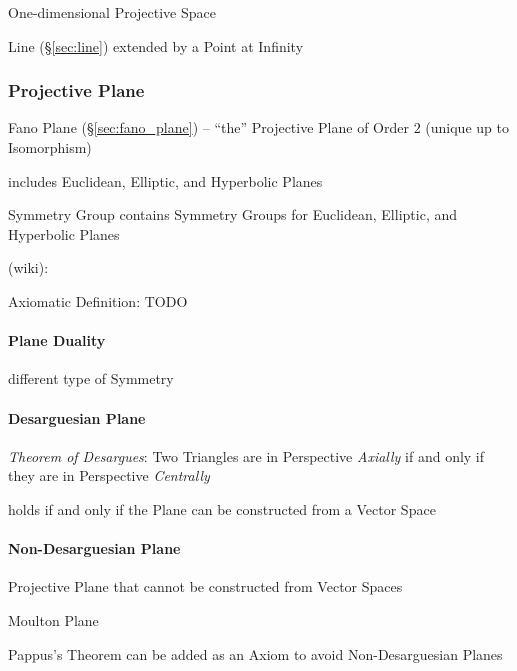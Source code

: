 One-dimensional Projective Space

Line (\S\ref{sec:line}) extended by a Point at Infinity



\subsubsection{Projective Plane}\label{sec:projective_plane}

Fano Plane (\S\ref{sec:fano_plane}) -- ``the'' Projective Plane of Order $2$
(unique up to Isomorphism)

includes Euclidean, Elliptic, and Hyperbolic Planes

Symmetry Group contains Symmetry Groups for Euclidean, Elliptic, and
Hyperbolic Planes

(wiki):

Axiomatic Definition: TODO



\paragraph{Plane Duality}\label{sec:plane_duality}\hfill

different type of Symmetry %



\paragraph{Desarguesian Plane}\label{sec:desarguesian_plane}\hfill

\emph{Theorem of Desargues}: Two Triangles are in Perspective \emph{Axially} if
and only if they are in Perspective \emph{Centrally}

holds if and only if the Plane can be constructed from a Vector Space



\paragraph{Non-Desarguesian Plane}\label{sec:non_desarguesian}\hfill

Projective Plane that cannot be constructed from Vector Spaces

Moulton Plane

Pappus's Theorem can be added as an Axiom to avoid Non-Desarguesian Planes




